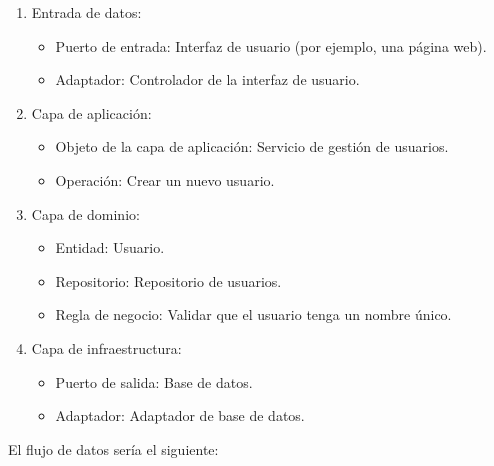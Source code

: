 \documentclass[executivepaper]{article}
\begin{document}
\begin{enumerate}
    \item Entrada de datos:
    \begin{itemize}
        \item Puerto de entrada: Interfaz de usuario (por ejemplo, una página web).
        \item Adaptador: Controlador de la interfaz de usuario.
    \end{itemize}
    \item Capa de aplicación:
    \begin{itemize}
        \item Objeto de la capa de aplicación: Servicio de gestión de usuarios.
        \item Operación: Crear un nuevo usuario.
    \end{itemize}
    \item Capa de dominio:
    \begin{itemize}
        \item Entidad: Usuario.
        \item Repositorio: Repositorio de usuarios.
        \item Regla de negocio: Validar que el usuario tenga un nombre único.
    \end{itemize}
    \item Capa de infraestructura:
    \begin{itemize}
        \item Puerto de salida: Base de datos.
        \item Adaptador: Adaptador de base de datos.
    \end{itemize}
\end{enumerate}

El flujo de datos sería el siguiente:
\end{document}
